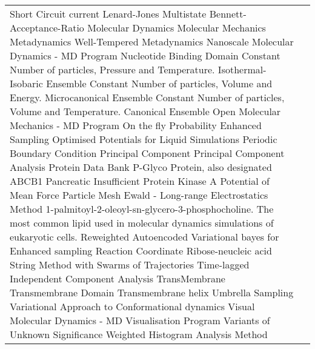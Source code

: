 \begin{center}
\begin{bfseries}
\begin{longtable}{@{}p{3cm}@{}p{\dimexpr\textwidth-1cm\relax}@{}}
\nomenclature{${\small Isc}$}      {Short Circuit current}
\nomenclature{${\small LJ}$}       {Lenard-Jones}
\nomenclature{${\small MBAR}$}     {Multistate Bennett-Acceptance-Ratio}
\nomenclature{${\small MD}$}       {Molecular Dynamics}
\nomenclature{${\small MM}$}       {Molecular Mechanics}
\nomenclature{${\small MetaD}$}    {Metadynamics}
\nomenclature{${\small WT-MetaD}$} {Well-Tempered Metadynamics}
\nomenclature{${\small NAMD}$}     {Nanoscale Molecular Dynamics - MD Program}
\nomenclature{${\small NBD}$}      {Nucleotide Binding Domain}
\nomenclature{${\small NPT}$}      {Constant Number of particles, Pressure and Temperature. Isothermal-Isobaric Ensemble}
\nomenclature{${\small NVE}$}      {Constant Number of particles, Volume and Energy. Microcanonical Ensemble}
\nomenclature{${\small NVT}$}      {Constant Number of particles, Volume and Temperature. Canonical Ensemble}
\nomenclature{${\small OpenMM}$}   {Open Molecular Mechanics - MD Program}
\nomenclature{${\small OPES}$}     {On the fly Probability Enhanced Sampling}
\nomenclature{${\small OPLS}$}     {Optimised Potentials for Liquid Simulations}
\nomenclature{${\small PBC}$}      {Periodic Boundary Condition}
\nomenclature{${\small PC}$}       {Principal Component}
\nomenclature{${\small PCA}$}      {Principal Component Analysis}
\nomenclature{${\small PDB}$}      {Protein Data Bank}
\nomenclature{${\small PGP}$}      {P-Glyco Protein, also designated ABCB1}
\nomenclature{${\small PI}$}       {Pancreatic Insufficient}
\nomenclature{${\small PKA}$}      {Protein Kinase A}
\nomenclature{${\small PMF}$}      {Potential of Mean Force}
\nomenclature{${\small PME}$}      {Particle Mesh Ewald - Long-range Electrostatics Method}
\nomenclature{${\small POPC}$}     {1-palmitoyl-2-oleoyl-sn-glycero-3-phosphocholine. The most common lipid used in molecular dynamics simulations of eukaryotic cells.}
\nomenclature{${\small RAVE}$}     {Reweighted Autoencoded Variational bayes for Enhanced sampling}
\nomenclature{${\small RC}$}       {Reaction Coordinate}
\nomenclature{${\small RNA}$}      {Ribose-neucleic acid}
\nomenclature{${\small SMwST}$}    {String Method with Swarms of Trajectories}
\nomenclature{${\small TICA}$}     {Time-lagged Independent Component Analysis}
\nomenclature{${\small TM}$}       {TransMembrane}
\nomenclature{${\small TMD}$}      {Transmembrane Domain}
\nomenclature{${\small TMH}$}      {Transmembrane helix}
\nomenclature{${\small US}$}       {Umbrella Sampling}
\nomenclature{${\small VAC}$}      {Variational Approach to Conformational dynamics}
\nomenclature{${\small VMD}$}      {Visual Molecular Dynamics - MD Visualisation Program}
\nomenclature{${\small VUS}$}      {Variants of Unknown Significance}
\nomenclature{${\small WHAM}$}     {Weighted Histogram Analysis Method}
\end{longtable}
\end{bfseries}
\end{center}
